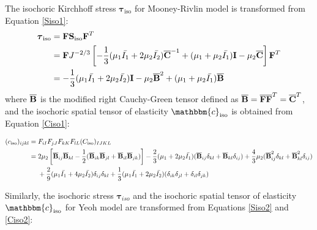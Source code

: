 \begin{appendices}
The isochoric Kirchhoff stress $\boldsymbol{\tau}_\mathrm{iso}$ for Mooney-Rivlin model is transformed from Equation \ref{Siso1}:
\begin{equation} \label{Tauiso1}
\begin{split}
\boldsymbol{\tau}_\mathrm{iso} &= \bold{F}\bold{S}_\mathrm{iso}{\bold{F}}^T \\
	   			    &= \bold{F}  J^{-2/3} \left[    - \frac{1}{3}(\mu_1\bar{I_1} + 2\mu_2\bar{I_2}) \overline{\bold{C}}^{-1}  + (\mu_1 + \mu_2\bar{I_1})\bold{I} - \mu_2\overline{\bold{C}} \right]   \bold{F}^T 
\\
				    &= - \frac{1}{3}(\mu_1\bar{I_1} + 2\mu_2\bar{I_2})\bold{I} - \mu_2{\overline{\bold{B}}}^2 + (\mu_1 + \mu_2\bar{I_1}){\overline{\bold{B}}}
\end{split}
\end{equation}
where $\overline{\bold{B}}$ is the modified right Cauchy-Green tensor defined as $\overline{\bold{B}} = \overline{\bold{F}}\overline{\bold{F}}^T = \overline{\bold{C}}^T$, and the isochoric spatial tensor of elasticity $\mathbbm{c}_\mathrm{iso}$ is obtained from Equation \ref{Ciso1}:
\begin{strip}
\begin{equation} \label{spatial_ciso1}
\begin{split}
(c_\mathrm{iso})_{ijkl} = {}&  F_{iI}F_{jJ}F_{kK}F_{lL}(C_\mathrm{iso})_{IJKL} \\
= {} &
2\mu_2 \left[{\overline{\bold{B}}}_{ij} {\overline{\bold{B}}}_{kl} - \frac{1}{2}({\overline{\bold{B}}}_{ik}{\overline{\bold{B}}}_{jl} + {\overline{\bold{B}}}_{il}{\overline{\bold{B}}}_{jk}) \right]
- \frac{2}{3}(\mu_1 + 2\mu_2\bar{I_1})({\overline{\bold{B}}}_{ij}\delta_{kl} + {\overline{\bold{B}}}_{kl}\delta_{ij}) 
+ \frac{4}{3}\mu_2({\overline{\bold{B}}}^2_{ij}\delta_{kl} + {\overline{\bold{B}}}^2_{kl}\delta_{ij}) \\
&+
\frac{2}{9}(\mu_1\bar{I_1} + 4\mu_2\bar{I_2}) \delta_{ij}\delta_{kl}
+ \frac{1}{3}(\mu_1\bar{I_1} + 2\mu_2\bar{I_2})(\delta_{ik}\delta_{jl} + \delta_{il}\delta_{jk})
\end{split}
\end{equation} 

Similarly, the isochoric stress $\boldsymbol{\tau}_{iso}$ and the isochoric spatial tensor of elasticity $\mathbbm{c}_\mathrm{iso}$ for Yeoh model are transformed from Equations \ref{Siso2} and \ref{Ciso2}:


\end{strip}
\end{appendices}
